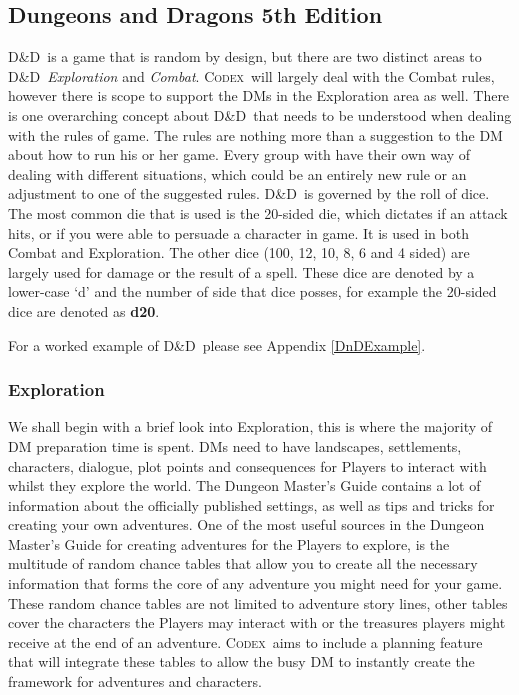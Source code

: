 \documentclass[review]{cmpreport}
\newcommand{\dnd}{D\&D}
\newcommand{\Codex}{\textsc{Codex}}
\begin{document}
	\subsection{Dungeons and Dragons 5th Edition}
	\dnd \ is a game that is random by design, but there are two distinct areas to \dnd \, \emph{Exploration} and \emph{Combat}. \Codex \ will largely deal with the Combat rules, however there is scope to support the DMs in the Exploration area as well. There is one overarching concept about \dnd \ that needs to be understood when dealing with the rules of game. The rules are nothing more than a suggestion to the DM about how to run his or her game. Every group with have their own way of dealing with different situations, which could be an entirely new rule or an adjustment to one of the suggested rules. \dnd \ is governed by the roll of dice. The most common die that is used is the 20-sided die, which dictates if an attack hits, or if you were able to persuade a character in game. It is used in both Combat and Exploration. The other dice (100, 12, 10, 8, 6 and 4 sided) are largely used for damage or the result of a spell. These dice are denoted by a lower-case `d' and the number of side that dice posses, for example the 20-sided dice are denoted as \textbf{d20}.
	
	For a worked example of \dnd \ please see Appendix \ref{DnDExample}.
	
	\subsubsection{Exploration}
	We shall begin with a brief look into Exploration, this is where the majority of DM preparation time is spent. DMs need to have landscapes, settlements, characters, dialogue, plot points and consequences for Players to interact with whilst they explore the world. The Dungeon Master's Guide \cite{DMGuide} contains a lot of information about the officially published settings, as well as tips and tricks for creating your own adventures. One of the most useful sources in the Dungeon Master's Guide for creating adventures for the Players to explore, is the multitude of random chance tables that allow you to create all the necessary information that forms the core of any adventure you might need for your game. These random chance tables are not limited to adventure story lines, other tables cover the characters the Players may interact with or the treasures players might receive at the end of an adventure. \Codex \ aims to include a planning feature that will integrate these tables to allow the busy DM to instantly create the framework for adventures and characters. 
	
\end{document}

